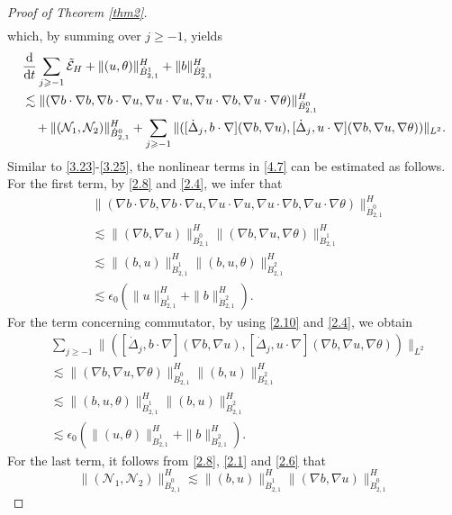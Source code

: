 \documentclass[reqno]{amsart}
\begin{document}
\begin{proof}[Proof of Theorem \ref{thm2}]
\begin{align*}
 \end{align*}
which, by summing over $j\geqslant-1$, yields
 \begin{equation}\label{4.7}
\begin{aligned}
&\frac{\rm d}{{\rm d}t}\sum_{j\geqslant-1}\tilde{\mathcal{E}}_H
 +\|(u,\theta)\|_{\dot{B}^1_{2,1}}^H+\|b\|_{\dot{B}^2_{2,1}}^H \\
&\lesssim\|(\nabla b\cdot\nabla b,\nabla b\cdot\nabla u,\nabla u\cdot\nabla u,
 \nabla u\cdot\nabla b,\nabla u\cdot\nabla \theta)\|_{\dot{B}^0_{2,1}}^H \\
&\quad +\|( \mathcal{N}_1, \mathcal{N}_2)\|_{\dot{B}^0_{2,1}}^H
 +\sum_{j\geqslant-1}\|([\dot{\Delta}_j,b\cdot\nabla](\nabla b,\nabla u),
 [\dot{\Delta}_j,u\cdot\nabla](\nabla b,\nabla u,\nabla\theta))\|_{L^2}.
\end{aligned}
\end{equation}
Similar to \eqref{3.23}-\eqref{3.25}, the nonlinear terms in \eqref{4.7} can be 
estimated as follows. For the first term, by \eqref{2.8} and \eqref{2.4}, we infer that
\begin{align*}
&\|(\nabla b\cdot\nabla b,\nabla b\cdot\nabla u,\nabla u\cdot\nabla u,\nabla u\cdot
 \nabla b,\nabla u\cdot\nabla \theta)\|_{\dot{B}^0_{2,1}}^H \\
&\lesssim\|(\nabla b,\nabla u)\|_{\dot{B}^0_{2,1}}^H\|(\nabla b,\nabla u,\nabla\theta)\|_{\dot{B}^1_{2,1}}^H \\
&\lesssim\|( b, u)\|_{\dot{B}^1_{2,1}}^H\|( b, u,\theta)\|_{\dot{B}^2_{2,1}}^H \\
&\lesssim\epsilon_0(\|u\|_{\dot{B}^1_{2,1}}^H+\|b\|_{\dot{B}^2_{2,1}}^H).
\end{align*}
For the term concerning commutator, by using \eqref{2.10} and \eqref{2.4}, we obtain
\begin{align*}
&\sum_{j\geqslant-1}\|([\dot{\Delta}_j,b\cdot\nabla](\nabla b,
  \nabla u),[\dot{\Delta}_j,u\cdot\nabla](\nabla b,\nabla u,\nabla\theta))\|_{L^2} \\
&\lesssim\|(\nabla b,\nabla u,\nabla\theta)\|_{\dot{B}^0_{2,1}}^H\|( b, u)\|_{\dot{B}^2_{2,1}}^H \\
&\lesssim\|( b, u,\theta)\|_{\dot{B}^1_{2,1}}^H\|( b, u)\|_{\dot{B}^2_{2,1}}^H \\
&\lesssim\epsilon_0(\|(u,\theta)\|_{\dot{B}^1_{2,1}}^H+\|b\|_{\dot{B}^2_{2,1}}^H).
\end{align*}
For the last term, it follows from \eqref{2.8}, \eqref{2.1} and \eqref{2.6} that
\[
 \|( \mathcal{N}_1, \mathcal{N}_2)\|_{\dot{B}^0_{2,1}}^H
\lesssim \|( b, u)\|_{\dot{B}^1_{2,1}}^H\|(\nabla b,\nabla u)\|_{\dot{B}^0_{2,1}}^H 
\]
\end{proof}
\end{document}
